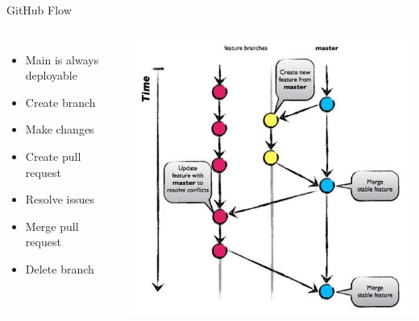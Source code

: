 \documentclass{slide}
\begin{document}
\begin{frame}{GitHub Flow \cite{github-flow}}
    \vspace{1pt}
    \begin{columns}
      {\LARGE
        \begin{itemize}
            \item Main is always deployable
            \item Create branch
            \item Make changes
            \item Create pull request
            \item Resolve issues
            \item Merge pull request
            \item Delete branch
        \end{itemize}
      }
        \centering
        \includegraphics[height=0.93\textheight]{diagrams/github-flow.jpeg}
    \end{columns}
\end{frame}
\end{document}
